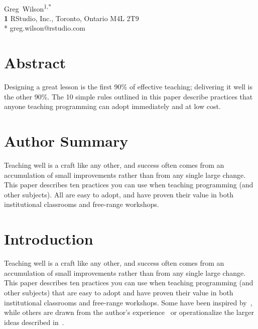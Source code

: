 \documentclass[10pt,letterpaper]{article}
\begin{document}
\vspace*{0.2in}

\begin{flushleft}
{\Large
\textbf{}
}
\newline
\\
{Greg~Wilson}\textsuperscript{1,*}
\\
\textbf{1} RStudio, Inc., Toronto, Ontario M4L 2T9
\\
\bigskip
* greg.wilson@rstudio.com
\end{flushleft}

\section*{Abstract}

Designing a great lesson is the first 90\% of effective teaching;
delivering it well is the other 90\%.
The 10 simple rules outlined in this paper
describe practices that anyone teaching programming can adopt immediately and at low cost.

\section*{Author Summary}

Teaching well is a craft like any other,
and success often comes from an accumulation of small improvements
rather than from any single large change.
This paper describes ten practices you can use when teaching programming (and other subjects).
All are easy to adopt,
and have proven their value in both institutional classrooms and free-range workshops.

\section*{Introduction}

Teaching well is a craft like any other,
and success often comes from an accumulation of small improvements
rather than from any single large change.
This paper describes ten practices you can use when teaching programming (and other subjects)
that are easy to adopt
and have proven their value in both institutional classrooms and free-range workshops.
Some have been inspired by~\cite{Hust2012,Lang2016,Lemo2014},
while others are drawn from the author's experience~\cite{Wils2016}
or operationalize the larger ideas described in~\cite{Brow2018,Deve2018}.
\end{document}
